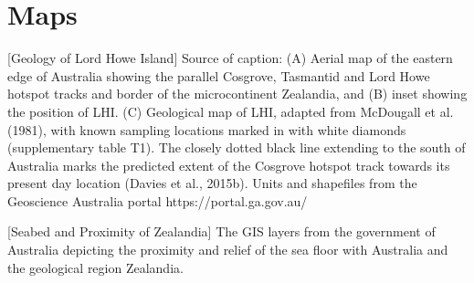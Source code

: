 \documentclass[11pt]{article}
\begin{document}
\appendix
\section{Maps}
\noindent%
\begin{minipage}{\linewidth}%
\captionsetup{width=0.8\linewidth}
[Geology of Lord Howe Island]{
Source of caption\cite{lhi}:
(A) Aerial map of the eastern edge of Australia showing the parallel Cosgrove, Tasmantid and Lord Howe hotspot tracks and border of the microcontinent
Zealandia, and (B) inset showing the position of LHI. (C) Geological map of LHI, adapted from McDougall et al. (1981), with known sampling locations marked in
with white diamonds (supplementary table T1). The closely dotted black line extending to the south of Australia marks the predicted extent of the Cosgrove hotspot
track towards its present day location (Davies et al., 2015b). Units and shapefiles from the Geoscience Australia portal https://portal.ga.gov.au/}
\label{geol1}
\end{minipage}
\vskip5mm

\noindent%
\begin{minipage}{\linewidth}%
\captionsetup{width=0.8\linewidth}
[Seabed and Proximity of Zealandia]{
The GIS layers from the government of Australia depicting the proximity
and relief of the sea floor with Australia and the geological 
region Zealandia.}
\label{geol2}
\end{minipage}
\vskip5mm
\end{document}
